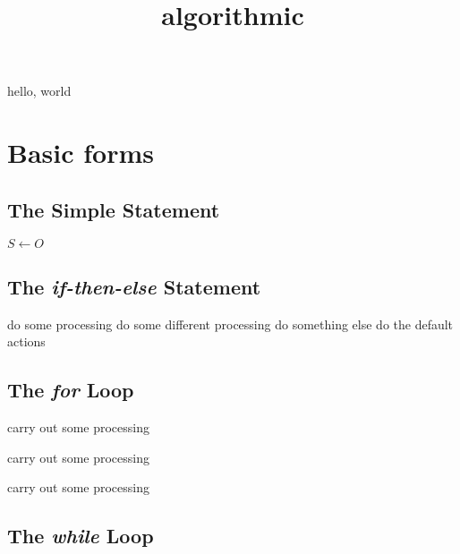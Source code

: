 \documentclass{amsart}
\title{algorithmic}
\begin{document}
\maketitle

hello, world

\section{Basic forms}

\subsection{The Simple Statement}

\begin{algorithmic}
\STATE $S \leftarrow O$
\end{algorithmic}

\subsection{The \emph{if-then-else} Statement}

\begin{algorithmic}
    \STATE do some processing
    \STATE do some different processing
    \STATE do something else
\ELSE
    \STATE do the default actions
\ENDIF
\end{algorithmic}

\subsection{The \emph{for} Loop}

\begin{algorithmic}
    \STATE carry out some processing 
\ENDFOR
\end{algorithmic}

\begin{algorithmic}
    \STATE carry out some processing 
\ENDFOR
\end{algorithmic}

\begin{algorithmic}
    \STATE carry out some processing 
\ENDFOR
\end{algorithmic}

\subsection{The \emph{while} Loop}
\end{document}
